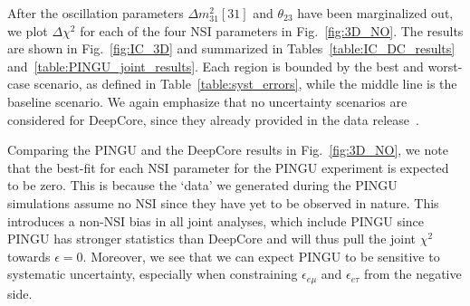 \documentclass{revtex4-2}
\newcommand{\eet}{\epsilon_{e\tau}}
\newcommand{\eem}{\epsilon_{e\mu}}
\newcommand{\dm}{\Delta m^2_{31}}
\begin{document}
{After the oscillation parameters $\dm[31]$ and $\theta_{23}$ have been marginalized out, we plot $\Delta \chi^2$ for each of the four NSI parameters in Fig.~\ref{fig:3D_NO}. 
The results are shown in Fig.~\ref{fig:IC_3D} and summarized in Tables~\ref{table:IC_DC_results} and~\ref{table:PINGU_joint_results}. Each region is bounded
by the best and worst-case scenario, as defined in Table~\ref{table:syst_errors}, while the middle line is the baseline scenario. We again emphasize that 
no uncertainty scenarios are considered for DeepCore, since they already provided in the data release~\cite{DC2019data}.

Comparing the PINGU and the DeepCore results in Fig.~\ref{fig:3D_NO}, we note that the best-fit for each NSI parameter for the PINGU experiment is expected to be zero. This is because the `data' we generated during 
the PINGU simulations assume no NSI since they have yet to be observed in nature. This introduces a non-NSI bias in all joint analyses, which include PINGU
since PINGU has stronger statistics than DeepCore and will thus pull the joint $\chi^2$ towards $\epsilon =0$.
Moreover, we see that we can expect PINGU to be sensitive to systematic uncertainty, especially when constraining $\eem$ and $\eet$ from the negative side.

}
\end{document}
